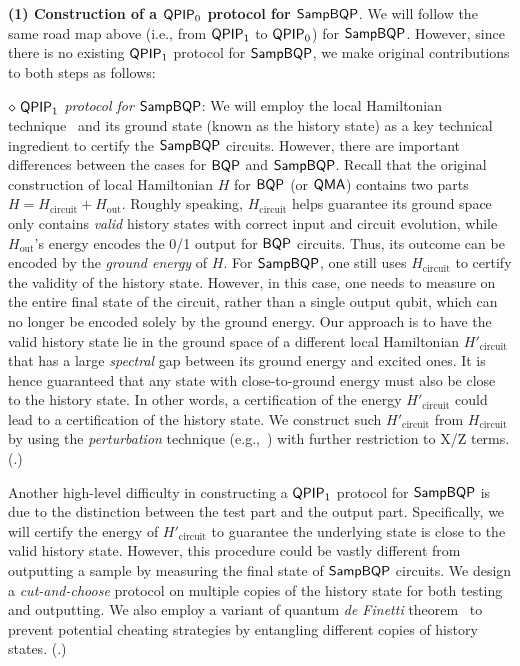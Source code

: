 \vspace{2mm} \noindent \textbf{(1) Construction of a $\operatorname{\mathsf{QPIP}}_0$ protocol for $\operatorname{\mathsf{SampBQP}}$}.
We will follow the same road map above (i.e., from $\operatorname{\mathsf{QPIP}}_1$ to $\operatorname{\mathsf{QPIP}}_0$) for $\operatorname{\mathsf{SampBQP}}$. However, since there is no existing $\operatorname{\mathsf{QPIP}}_1$ protocol for $\operatorname{\mathsf{SampBQP}}$, we make original contributions to both steps as follows:

\vspace{2mm} \noindent \emph{$\diamond \, \operatorname{\mathsf{QPIP}}_1$ protocol for $\operatorname{\mathsf{SampBQP}}$}: We will employ the local Hamiltonian technique~\cite{kitaev2002classical} and its ground state (known as the history state) as a key technical ingredient to certify the $\operatorname{\mathsf{SampBQP}}$ circuits.
However, there are important differences between the cases for $\operatorname{\mathsf{BQP}}$ and $\operatorname{\mathsf{SampBQP}}$.
Recall that the original construction of local Hamiltonian $H$ for $\operatorname{\mathsf{BQP}}$ (or $\operatorname{\mathsf{QMA}}$) contains two parts $H=H_{\mathrm{circuit}}+ H_{\mathrm{out}}$.
Roughly speaking, $H_{\mathrm{circuit}}$ helps guarantee its ground space only contains \emph{valid} history states with correct input and circuit evolution, while $H_{\mathrm{out}}$'s energy encodes the 0/1 output for $\operatorname{\mathsf{BQP}}$ circuits.
Thus, its outcome can be encoded by the \emph{ground energy} of $H$.
For $\operatorname{\mathsf{SampBQP}}$, one still uses $H_{\mathrm{circuit}}$ to certify the validity of the history state.
However, in this case, one needs to measure on the entire final state of the circuit, rather than a single output qubit,
which can no longer be encoded solely by the ground energy.
Our approach is to have the valid history state lie in the ground space of a different local Hamiltonian $H'_{\mathrm{circuit}}$  that has a large \emph{spectral} gap between its ground energy and excited ones.
It is hence guaranteed that any state with close-to-ground energy must also be close to the history state.
In other words, a certification of the energy $H'_{\mathrm{circuit}}$ could lead to a certification of the history state.
We construct such $H'_{\mathrm{circuit}}$ from $H_{\mathrm{circuit}}$ by using the \emph{perturbation} technique (e.g.,~\cite{kempe_kitaev_regev_2006}) with further restriction to X/Z terms. (.)


Another high-level difficulty in constructing a $\operatorname{\mathsf{QPIP}}_1$ protocol for $\operatorname{\mathsf{SampBQP}}$ is due to the distinction between the test part and the output part.
Specifically, we will certify the energy of $H'_{\mathrm{circuit}}$ to guarantee the underlying state is close to the valid history state.
However, this procedure could be vastly different from outputting a sample by measuring the final state of $\operatorname{\mathsf{SampBQP}}$ circuits.
We design a \emph{cut-and-choose} protocol on multiple copies of the history state for both testing and outputting.
We also employ a variant of quantum \emph{de Finetti} theorem~\cite{Brandão2017}
to prevent potential cheating strategies by entangling different copies of history states.
(.)

